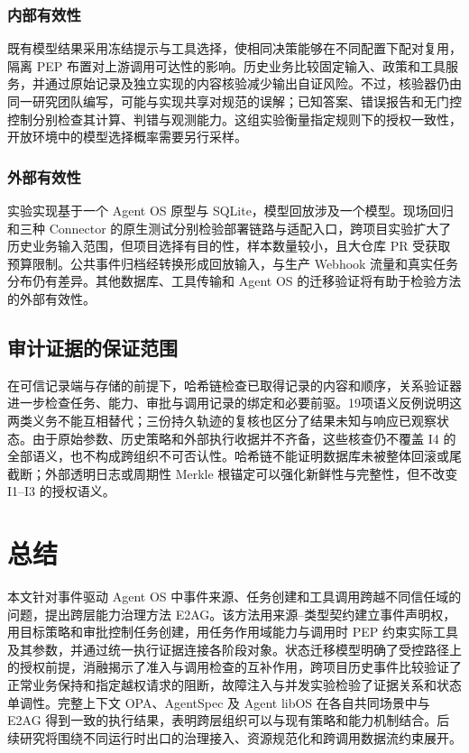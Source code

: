 \subsubsection{内部有效性}

既有模型结果采用冻结提示与工具选择，使相同决策能够在不同配置下配对复用，隔离 PEP 布置对上游调用可达性的影响。历史业务比较固定输入、政策和工具服务，并通过原始记录及独立实现的内容核验减少输出自证风险。不过，核验器仍由同一研究团队编写，可能与实现共享对规范的误解；已知答案、错误报告和无门控控制分别检查其计算、判错与观测能力。这组实验衡量指定规则下的授权一致性，开放环境中的模型选择概率需要另行采样。

\subsubsection{外部有效性}

实验实现基于一个 Agent OS 原型与 SQLite，模型回放涉及一个模型。现场回归和三种 Connector 的原生测试分别检验部署链路与适配入口，跨项目实验扩大了历史业务输入范围，但项目选择有目的性，样本数量较小，且大仓库 PR 受获取预算限制。公共事件归档经转换形成回放输入，与生产 Webhook 流量和真实任务分布仍有差异。其他数据库、工具传输和 Agent OS 的迁移验证将有助于检验方法的外部有效性。

\subsection{审计证据的保证范围}

在可信记录端与存储的前提下，哈希链检查已取得记录的内容和顺序，关系验证器进一步检查任务、能力、审批与调用记录的绑定和必要前驱。19项语义反例说明这两类义务不能互相替代；三份持久轨迹的复核也区分了结果未知与响应已观察状态。由于原始参数、历史策略和外部执行收据并不齐备，这些核查仍不覆盖 I4 的全部语义，也不构成跨组织不可否认性。哈希链不能证明数据库未被整体回滚或尾截断；外部透明日志或周期性 Merkle 根锚定可以强化新鲜性与完整性，但不改变 I1--I3 的授权语义。

\section{总结}\label{sec:conclusion-v11}

本文针对事件驱动 Agent OS 中事件来源、任务创建和工具调用跨越不同信任域的问题，提出跨层能力治理方法 E2AG。该方法用来源--类型契约建立事件声明权，用目标策略和审批控制任务创建，用任务作用域能力与调用时 PEP 约束实际工具及其参数，并通过统一执行证据连接各阶段对象。状态迁移模型明确了受控路径上的授权前提，消融揭示了准入与调用检查的互补作用，跨项目历史事件比较验证了正常业务保持和指定越权请求的阻断，故障注入与并发实验检验了证据关系和状态单调性。完整上下文 OPA、AgentSpec 及 Agent libOS 在各自共同场景中与 E2AG 得到一致的执行结果，表明跨层组织可以与现有策略和能力机制结合。后续研究将围绕不同运行时出口的治理接入、资源规范化和跨调用数据流约束展开。

